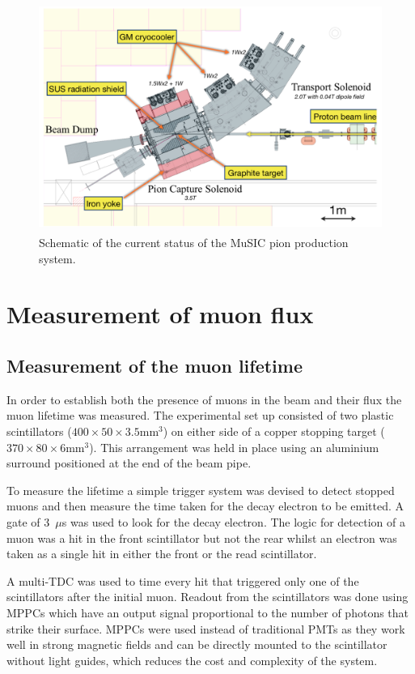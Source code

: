 \documentclass[a4paper]{jpconf}
\begin{document}
\begin{figure}[htbp]
    \centering
        \includegraphics[height=7.5cm]{images/MuSIC_current_schematic.png}
    \caption{Schematic of the current status of the MuSIC pion production system.}
    \label{fig:MuSIC_schematic}
\end{figure}


\section{Measurement of muon flux}
\subsection{Measurement of the muon lifetime}
In order to establish both the presence of muons in the beam and their flux the muon lifetime was measured. The experimental set up consisted of two plastic scintillators ($400\times 50\times 3.5$mm$^3$) on either side of a copper stopping target ($370\times 80\times 6$mm$^3$). This arrangement was held in place using an aluminium surround positioned at the end of the beam pipe. 

To measure the lifetime a simple trigger system was devised to detect stopped muons and then measure the time taken for the decay electron to be emitted. A gate of 3~$\mu$s was used to look for the decay electron. The logic for detection of a muon was a hit in the front scintillator but not the rear whilst an electron was taken as a single hit in either the front or the read scintillator. 

A multi-TDC was used to time every hit that triggered only one of the scintillators after the initial muon. Readout from the scintillators was done using MPPCs which have an output signal proportional to the number of photons that strike their surface. MPPCs were used instead of traditional PMTs as they work well in strong magnetic fields and can be directly mounted to the scintillator without light guides, which reduces the cost and complexity of the system. 
\end{document}
